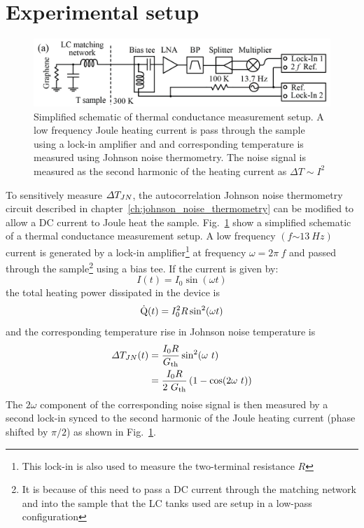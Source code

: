 \section{Experimental setup}
\begin{figure}[b]
\centering
\includegraphics[width=130mm]{figures/thermal_via_noise/Schematic_Joule_heating.png}
\caption{Simplified schematic of thermal conductance measurement setup. A low frequency Joule heating current is pass through the sample using a lock-in amplifier and and corresponding temperature is measured using Johnson noise thermometry. The noise signal is measured as the second harmonic of the heating current as $\Delta T \sim I^2$}
\label{fig:schematic_Joule_heating}
\end{figure}
To sensitively measure $\Delta T_{JN}$, the autocorrelation Johnson noise thermometry circuit described in chapter~\ref{ch:johnson_noise_thermometry} can be modified to allow a DC current to Joule heat the sample. Fig.~\ref{fig:schematic_Joule_heating} show a simplified schematic of a thermal conductance measurement setup. A low frequency $(f{\sim 13}~Hz)$ current is generated by a lock-in amplifier\footnote{This lock-in is also used to measure the two-terminal resistance $R$} at frequency $\omega = 2\pi~f$ and passed through the sample\footnote{It is because of this need to pass a DC current through the matching network and into the sample that the LC tanks used are setup in a low-pass configuration} using a bias tee. If the current is given by:
\begin{equation}
I(t) = I_0\sin(\omega t)
\end{equation}
the total heating power dissipated in the device is
\begin{equation}
\dot{\mathrm{Q}}(t) = I_0^2R\sin^2(\omega t)
\end{equation}
and the corresponding temperature rise in Johnson noise temperature is 
\begin{align}
\Delta T_{JN}(t) &= \frac{I_0R}{G_{\mathrm{th}}}\sin^2(\omega~t) \nonumber \\
&=\frac{I_0R}{2~G_{\mathrm{th}}}\left(1-\cos(2\omega~t)\right)
\end{align}
The $2\omega$ component of the corresponding noise signal is then measured by a second lock-in synced to the second harmonic of the Joule heating current (phase shifted by $\pi/2$) as shown in Fig.~\ref{fig:schematic_Joule_heating}.

